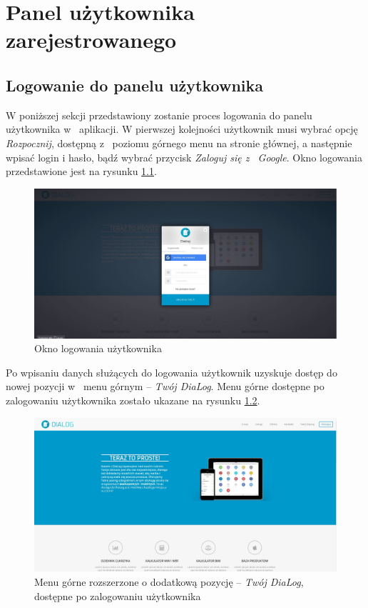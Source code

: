 \chapter{Panel użytkownika zarejestrowanego}

\section{Logowanie do panelu użytkownika}
W poniższej sekcji przedstawiony zostanie proces logowania do panelu użytkownika w~ aplikacji. W pierwszej kolejności użytkownik musi wybrać opcję \textit{Rozpocznij}, dostępną z~ poziomu górnego menu na stronie głównej, a następnie wpisać login i hasło, bądź wybrać przycisk \textit{Zaloguj się z~ Google}. Okno logowania przedstawione jest na rysunku \ref{Rys:logowanie}.

\begin{figure}[h]
	\centering\includegraphics[scale=0.3]{images/logowanie_google.jpg}
	\caption{Okno logowania użytkownika}
	\label{Rys:logowanie}
\end{figure}

Po wpisaniu danych służących do logowania użytkownik uzyskuje dostęp do nowej pozycji w~ menu górnym -- \textit{Twój DiaLog}. Menu górne dostępne po zalogowaniu użytkownika zostało ukazane na rysunku  \ref{Rys:logged}.

\begin{figure}[h]
	\centering\includegraphics[scale=0.3]{images/ekran_logged.jpg}
	\caption{Menu górne rozszerzone o dodatkową pozycję -- \textit{Twój DiaLog}, dostępne po zalogowaniu użytkownika}
	\label{Rys:logged}
\end{figure}

